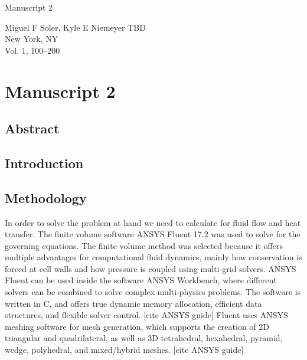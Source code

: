 \documentclass[onehalf,11pt]{beavtex}
\begin{document}
\phantom{}\newpage
\phantom{}\vfill
\begin{center}
\heading
Manuscript 2
\end{center}
\vfill
Miguel F Soler, Kyle E Niemeyer
\vfill\noindent
TBD\\
New York, NY\\
Vol. 1, 100--200
\vfill

\chapter{Manuscript 2}



\section{Abstract}
{\it 

}




\section{Introduction}

\section{Methodology}

In order to solve the problem at hand we need to calculate for fluid flow and heat transfer. 
The finite volume software ANSYS Fluent 17.2 was used to solve for the governing equations. 
The finite volume method was selected because it offers multiple advantages for computational fluid dynamics, mainly how conservation is forced at cell walls and how pressure is coupled using multi-grid solvers.
ANSYS Fluent can be used inside the software ANSYS Workbench, where different solvers can be combined to solve complex multi-physics problems. 
The software is written in C, and offers true dynamic memory allocation, efficient data structures, and flexible solver control. [cite ANSYS guide] 
Fluent uses ANSYS meshing software for mesh generation, which supports the creation of 2D triangular and quadrilateral, as well as 3D tetrahedral, hexahedral, pyramid, wedge, polyhedral, and mixed/hybrid meshes. [cite ANSYS guide] 
\end{document}
